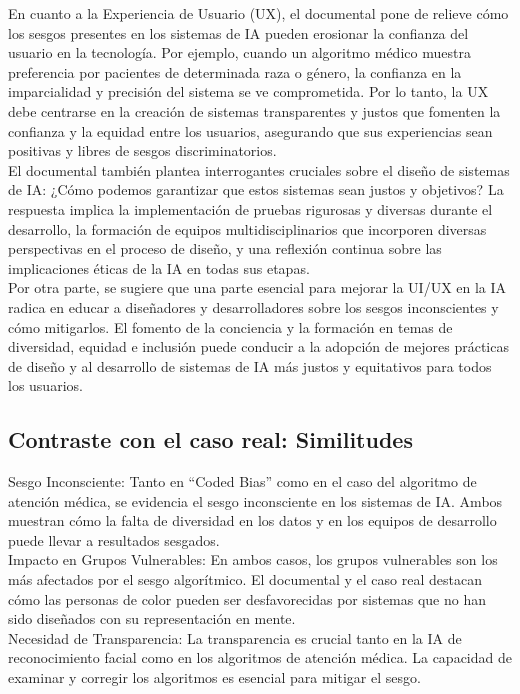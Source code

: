 \documentclass[conference]{IEEEtran}
\begin{document}
En cuanto a la Experiencia de Usuario (UX), el documental pone de relieve cómo los sesgos presentes en los sistemas de IA pueden erosionar la confianza del usuario en la tecnología. Por ejemplo, cuando un algoritmo médico muestra preferencia por pacientes de determinada raza o género, la confianza en la imparcialidad y precisión del sistema se ve comprometida. Por lo tanto, la UX debe centrarse en la creación de sistemas transparentes y justos que fomenten la confianza y la equidad entre los usuarios, asegurando que sus experiencias sean positivas y libres de sesgos discriminatorios.\\

El documental también plantea interrogantes cruciales sobre el diseño de sistemas de IA: ¿Cómo podemos garantizar que estos sistemas sean justos y objetivos? La respuesta implica la implementación de pruebas rigurosas y diversas durante el desarrollo, la formación de equipos multidisciplinarios que incorporen diversas perspectivas en el proceso de diseño, y una reflexión continua sobre las implicaciones éticas de la IA en todas sus etapas.\\

Por otra parte, se sugiere que una parte esencial para mejorar la UI/UX en la IA radica en educar a diseñadores y desarrolladores sobre los sesgos inconscientes y cómo mitigarlos. El fomento de la conciencia y la formación en temas de diversidad, equidad e inclusión puede conducir a la adopción de mejores prácticas de diseño y al desarrollo de sistemas de IA más justos y equitativos para todos los usuarios.\\


\subsection{Contraste con el caso real: Similitudes}

Sesgo Inconsciente: Tanto en “Coded Bias” como en el caso del algoritmo de atención médica, se evidencia el sesgo inconsciente en los sistemas de IA. Ambos muestran cómo la falta de diversidad en los datos y en los equipos de desarrollo puede llevar a resultados sesgados.\\[12pt]
Impacto en Grupos Vulnerables: En ambos casos, los grupos vulnerables son los más afectados por el sesgo algorítmico. El documental y el caso real destacan cómo las personas de color pueden ser desfavorecidas por sistemas que no han sido diseñados con su representación en mente.\\[12pt]
Necesidad de Transparencia: La transparencia es crucial tanto en la IA de reconocimiento facial como en los algoritmos de atención médica. La capacidad de examinar y corregir los algoritmos es esencial para mitigar el sesgo.
\end{document}
